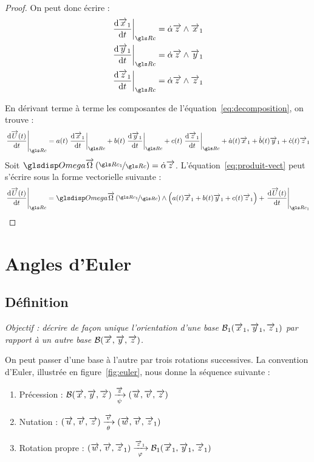 \begin{proof}
		On peut donc écrire :
		\begin{subequations}
			\label{eq:prodvect}
			\begin{align}
				\diff[\Rc]{\vect{x}_1}&=\dot{\alpha}\vect{z}\wedge\vect{x}_1\\
				\diff[\Rc]{\vect{y}_1}&=\dot{\alpha}\vect{z}\wedge\vect{y}_1\\
				\diff[\Rc]{\vect{z}_1}&=\dot{\alpha}\vect{z}\wedge\vect{z}_1
			\end{align}
		\end{subequations}
		
En dérivant terme à terme les composantes de l'équation~\eqref{eq:decomposition}, on trouve :
		\begin{equation}
			\diff[\Rc]{\vect{U}(t)}=a(t)\diff[\Rc]{\vect{x}_1}+b(t)\diff[\Rc]{\vect{y}_1}+c(t)\diff[\Rc]{\vect{z}_1}+
			\dot{a}(t)\vect{x}_1+\dot{b}(t)\vect{y}_1+\dot{c}(t)\vect{z}_1
			\label{eq:produit-vect}
		\end{equation}		
		Soit $\Om[\Rc]{\Rc_1}=\dot{\alpha}\vect{z}$.
		L'équation~\eqref{eq:produit-vect} peut s'écrire sous la forme vectorielle suivante :
		\begin{equation*}
			\diff[\Rc]{\vect{U}(t)}=\Om[\Rc]{\Rc_1}\wedge\Big(a(t)\vect{x}_1+b(t)\vect{y}_1+c(t)\vect{z}_1\Big)+\diff[\Rc_1]{\vect{U}(t)}
		\end{equation*}
	\end{proof}
	
\section{Angles d'Euler}
	\subsection{Définition}
	\label{sec:euler}
\emph{Objectif : décrire de façon unique l'orientation d'une base $\mathcal{B}_1(\overrightarrow{x}_1,\overrightarrow{y}_1,\overrightarrow{z}_1)$ par rapport à un autre base $\mathcal{B}(\overrightarrow{x},\overrightarrow{y},\overrightarrow{z})$.}

On peut passer d'une base à l'autre par trois rotations successives. La convention d'Euler, illustrée en figure~\ref{fig:euler}, nous donne la séquence suivante :
\begin{enumerate}
	\item Précession : $\mathcal{B}(\overrightarrow{x},\overrightarrow{y},\overrightarrow{z})\xrightarrow[\psi]{\overrightarrow{z}}(\overrightarrow{u},\overrightarrow{v},\overrightarrow{z})$
	\item Nutation : $(\overrightarrow{u},\overrightarrow{v},\overrightarrow{z})\xrightarrow[\theta]{\overrightarrow{v}}(\overrightarrow{w},\overrightarrow{v},\overrightarrow{z}_1)$
	\item Rotation propre : $(\overrightarrow{w},\overrightarrow{v},\overrightarrow{z}_1)\xrightarrow[\varphi]{\overrightarrow{z}_1}\mathcal{B}_1(\overrightarrow{x}_1,\overrightarrow{y}_1,\overrightarrow{z}_1)$
\end{enumerate}

